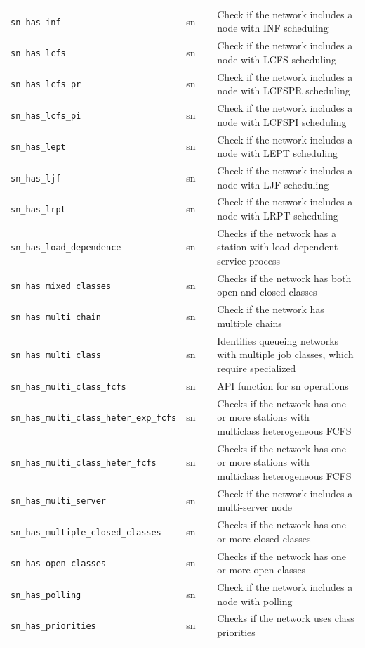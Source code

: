 \begin{footnotesize}
\begin{longtable}{|p{0.4\linewidth}|p{0.1\linewidth}|p{0.5\linewidth}|}
\texttt{sn\_has\_inf} & sn & Check if the network includes a node with INF scheduling\\
\texttt{sn\_has\_lcfs} & sn & Check if the network includes a node with LCFS scheduling\\
\texttt{sn\_has\_lcfs\_pr} & sn & Check if the network includes a node with LCFSPR scheduling\\
\texttt{sn\_has\_lcfs\_pi} & sn & Check if the network includes a node with LCFSPI scheduling\\
\texttt{sn\_has\_lept} & sn & Check if the network includes a node with LEPT scheduling\\
\texttt{sn\_has\_ljf} & sn & Check if the network includes a node with LJF scheduling\\
\texttt{sn\_has\_lrpt} & sn & Check if the network includes a node with LRPT scheduling\\
\texttt{sn\_has\_load\_dependence} & sn & Checks if the network has a station with load-dependent service process\\
\texttt{sn\_has\_mixed\_classes} & sn & Checks if the network has both open and closed classes\\
\texttt{sn\_has\_multi\_chain} & sn & Check if the network has multiple chains\\
\texttt{sn\_has\_multi\_class} & sn & Identifies queueing networks with multiple job classes, which require specialized\\
\texttt{sn\_has\_multi\_class\_fcfs} & sn & API function for sn operations\\
\texttt{sn\_has\_multi\_class\_heter\_exp\_fcfs} & sn & Checks if the network has one or more stations with multiclass heterogeneous FCFS\\
\texttt{sn\_has\_multi\_class\_heter\_fcfs} & sn & Checks if the network has one or more stations with multiclass heterogeneous FCFS\\
\texttt{sn\_has\_multi\_server} & sn & Check if the network includes a multi-server node\\
\texttt{sn\_has\_multiple\_closed\_classes} & sn & Checks if the network has one or more closed classes\\
\texttt{sn\_has\_open\_classes} & sn & Checks if the network has one or more open classes\\
\texttt{sn\_has\_polling} & sn & Check if the network includes a node with polling\\
\texttt{sn\_has\_priorities} & sn & Checks if the network uses class priorities\\

\end{longtable}
\end{footnotesize}
